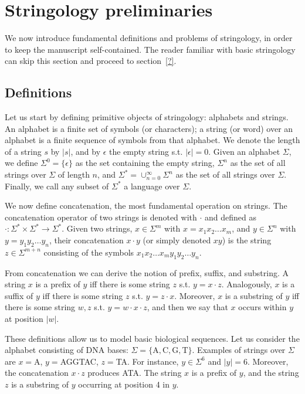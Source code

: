 
\section{Stringology preliminaries}

We now introduce fundamental definitions and problems of stringology, in order to keep the manuscript self-contained.
The reader familiar with basic stringology can skip this section and proceed to section~\ref{?}.

\subsection{Definitions}

Let us start by defining primitive objects of stringology: alphabets and strings.
An alphabet is a finite set of symbols (or characters); a string (or word) over an alphabet is a finite sequence of symbols from that alphabet.
We denote the length of a string $s$ by $|s|$, and by $\epsilon$ the empty string s.t. $|\epsilon|=0$.
Given an alphabet $\Sigma$, we define $\Sigma^0=\{ \epsilon \}$ as the set containing the empty string, $\Sigma^n$ as the set of all strings over $\Sigma$ of length $n$, and $\Sigma^* = \cup_{n=0}^{\infty}{\Sigma^n}$ as the set of all strings over $\Sigma$.
Finally, we call any subset of $\Sigma^*$ a language over $\Sigma$.

We now define concatenation, the most fundamental operation on strings.
The concatenation operator of two strings is denoted with $\cdot$ and defined as $\cdot : \Sigma^* \times \Sigma^* \rightarrow \Sigma^*$.
Given two strings, $x \in \Sigma^m$ with $x=x_1 x_2 \dots x_m$, and $y \in \Sigma^n$ with $y=y_1 y_2 \dots y_n$, their concatenation $x \cdot y$ (or simply denoted $xy$) is the string $z \in \Sigma^{m+n}$ consisting of the symbols $x_1 x_2 \dots x_m y_1 y_2 \dots y_n$.

From concatenation we can derive the notion of prefix, suffix, and substring.
A string $x$ is a prefix of $y$ iff there is some string $z$ s.t. $y=x\cdot z$.
Analogously, $x$ is a suffix of $y$ iff there is some string $z$ s.t. $y=z\cdot x$.
Moreover, $x$ is a substring of $y$ iff there is some string $w,z$ s.t. $y=w\cdot x \cdot z$, and then we say that $x$ occurs within $y$ at position $|w|$.

\begin{example}
These definitions allow us to model basic biological sequences.
Let us consider the alphabet consisting of DNA bases: $\Sigma = \{\text{A},\text{C},\text{G},\text{T}\}$.
Examples of strings over $\Sigma$ are $x=$A, $y=$AGGTAC, $z=$TA.
For instance, $y \in \Sigma^6$ and $| y | = 6$.
Moreover, the concatenation $x \cdot z$ produces ATA.
The string $x$ is a prefix of $y$, and the string $z$ is a substring of $y$  occurring at position 4 in $y$.
\end{example}

